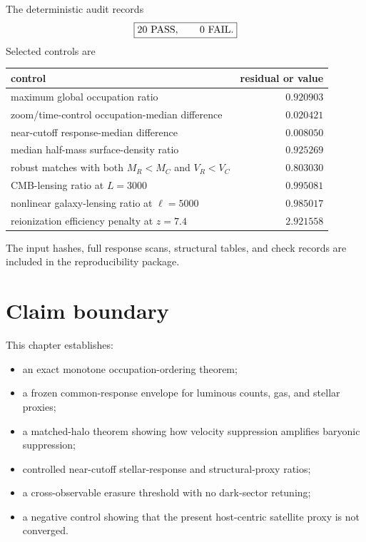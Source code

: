 The deterministic audit records
\begin{equation}
\boxed{20\ {\rm PASS},\qquad0\ {\rm FAIL}.}
\label{eq:brf-pass-count}
\end{equation}
Selected controls are
\begin{center}
\begin{tabular}{lr}
\toprule
control & residual or value\\
\midrule
maximum global occupation ratio & $0.920903$\\
zoom/time-control occupation-median difference & $0.020421$\\
near-cutoff response-median difference & $0.008050$\\
median half-mass surface-density ratio & $0.925269$\\
robust matches with both $M_R<M_C$ and $V_R<V_C$ & $0.803030$\\
CMB-lensing ratio at $L=3000$ & $0.995081$\\
nonlinear galaxy-lensing ratio at $\ell=5000$ & $0.985017$\\
reionization efficiency penalty at $z=7.4$ & $2.921558$\\
\bottomrule
\end{tabular}
\end{center}
The input hashes, full response scans, structural tables, and check records are included in the reproducibility package.

\section{Claim boundary}

This chapter establishes:
\begin{itemize}
\item an exact monotone occupation-ordering theorem;
\item a frozen common-response envelope for luminous counts, gas, and stellar proxies;
\item a matched-halo theorem showing how velocity suppression amplifies baryonic suppression;
\item controlled near-cutoff stellar-response and structural-proxy ratios;
\item a cross-observable erasure threshold with no dark-sector retuning;
\item a negative control showing that the present host-centric satellite proxy is not converged.
\end{itemize}

